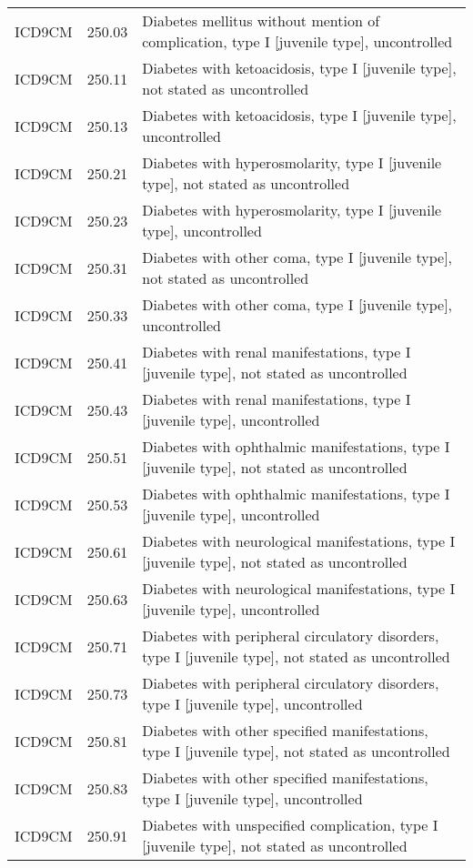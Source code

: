 \begin{longtable}{p{}p{}p{}}
  ICD9CM & 250.03 & Diabetes mellitus without mention of complication, type I [juvenile type], uncontrolled \\ 
  ICD9CM & 250.11 & Diabetes with ketoacidosis, type I [juvenile type], not stated as uncontrolled \\ 
  ICD9CM & 250.13 & Diabetes with ketoacidosis, type I [juvenile type], uncontrolled \\ 
  ICD9CM & 250.21 & Diabetes with hyperosmolarity, type I [juvenile type], not stated as uncontrolled \\ 
  ICD9CM & 250.23 & Diabetes with hyperosmolarity, type I [juvenile type], uncontrolled \\ 
  ICD9CM & 250.31 & Diabetes with other coma, type I [juvenile type], not stated as uncontrolled \\ 
  ICD9CM & 250.33 & Diabetes with other coma, type I [juvenile type], uncontrolled \\ 
  ICD9CM & 250.41 & Diabetes with renal manifestations, type I [juvenile type], not stated as uncontrolled \\ 
  ICD9CM & 250.43 & Diabetes with renal manifestations, type I [juvenile type], uncontrolled \\ 
  ICD9CM & 250.51 & Diabetes with ophthalmic manifestations, type I [juvenile type], not stated as uncontrolled \\ 
  ICD9CM & 250.53 & Diabetes with ophthalmic manifestations, type I [juvenile type], uncontrolled \\ 
  ICD9CM & 250.61 & Diabetes with neurological manifestations, type I [juvenile type], not stated as uncontrolled \\ 
  ICD9CM & 250.63 & Diabetes with neurological manifestations, type I [juvenile type], uncontrolled \\ 
  ICD9CM & 250.71 & Diabetes with peripheral circulatory disorders, type I [juvenile type], not stated as uncontrolled \\ 
  ICD9CM & 250.73 & Diabetes with peripheral circulatory disorders, type I [juvenile type], uncontrolled \\ 
  ICD9CM & 250.81 & Diabetes with other specified manifestations, type I [juvenile type], not stated as uncontrolled \\ 
  ICD9CM & 250.83 & Diabetes with other specified manifestations, type I [juvenile type], uncontrolled \\ 
  ICD9CM & 250.91 & Diabetes with unspecified complication, type I [juvenile type], not stated as uncontrolled \\ 

\end{longtable}
